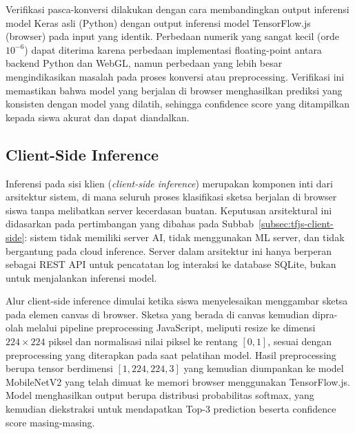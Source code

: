\documentclass[12pt,oneside]{report}
\begin{document}
Verifikasi pasca-konversi dilakukan dengan cara membandingkan output inferensi model Keras asli (Python) dengan output inferensi model TensorFlow.js (browser) pada input yang identik. Perbedaan numerik yang sangat kecil (orde $10^{-6}$) dapat diterima karena perbedaan implementasi floating-point antara backend Python dan WebGL, namun perbedaan yang lebih besar mengindikasikan masalah pada proses konversi atau preprocessing. Verifikasi ini memastikan bahwa model yang berjalan di browser menghasilkan prediksi yang konsisten dengan model yang dilatih, sehingga confidence score yang ditampilkan kepada siswa akurat dan dapat diandalkan.

\subsection{Client-Side Inference}
\label{subsec:client-side-inference}

Inferensi pada sisi klien (\textit{client-side inference}) merupakan komponen inti dari arsitektur sistem, di mana seluruh proses klasifikasi sketsa berjalan di browser siswa tanpa melibatkan server kecerdasan buatan. Keputusan arsitektural ini didasarkan pada pertimbangan yang dibahas pada Subbab~\ref{subsec:tfjs-client-side}: sistem tidak memiliki server AI, tidak menggunakan ML server, dan tidak bergantung pada cloud inference. Server dalam arsitektur ini hanya berperan sebagai REST API untuk pencatatan log interaksi ke database SQLite, bukan untuk menjalankan inferensi model.

Alur client-side inference dimulai ketika siswa menyelesaikan menggambar sketsa pada elemen canvas di browser. Sketsa yang berada di canvas kemudian dipra-olah melalui pipeline preprocessing JavaScript, meliputi resize ke dimensi $224 \times 224$ piksel dan normalisasi nilai piksel ke rentang $[0, 1]$, sesuai dengan preprocessing yang diterapkan pada saat pelatihan model. Hasil preprocessing berupa tensor berdimensi $[1, 224, 224, 3]$ yang kemudian diumpankan ke model MobileNetV2 yang telah dimuat ke memori browser menggunakan TensorFlow.js. Model menghasilkan output berupa distribusi probabilitas softmax, yang kemudian diekstraksi untuk mendapatkan Top-3 prediction beserta confidence score masing-masing.
\end{document}

